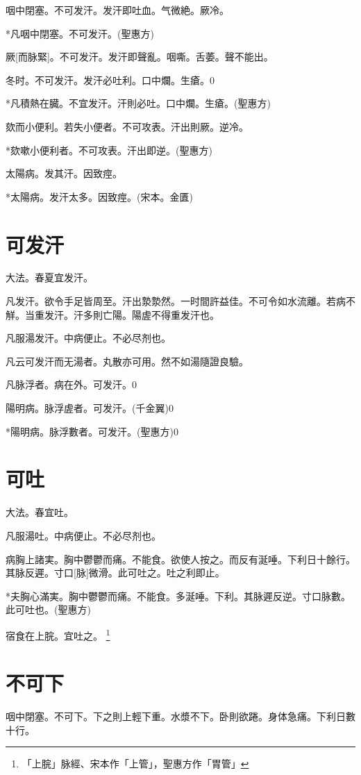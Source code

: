 \documentclass[12pt,twoside,UTF8,b5paper]{ctexbook}
\begin{document}
咽中閉塞。不可发汗。发汗即吐血。气微絶。厥冷。

*凡咽中閉塞。不可发汗。(聖惠方)

厥[而脉緊]。不可发汗。发汗即聲亂。咽嘶。舌萎。聲不能出。

冬时。不可发汗。发汗必吐利。口中爛。生瘡。0

*凡積熱在臓。不宜发汗。汗則必吐。口中爛。生瘡。(聖惠方)

欬而小便利。若失小便者。不可攻表。汗出則厥。逆冷。

*欬嗽小便利者。不可攻表。汗出即逆。(聖惠方)

太陽病。发其汗。因致痙。

*太陽病。发汗太多。因致痙。(宋本。金匱)

\chapter{可发汗}

大法。春夏宜发汗。

凡发汗。欲令手足皆周至。汗出漐漐然。一时間許益佳。不可令如水流離。若病不觧。当重发汗。汗多則亡陽。陽虗不得重发汗也。

凡服湯发汗。中病便止。不必尽剂也。

凡云可发汗而无湯者。丸散亦可用。然不如湯隨證良驗。

凡脉浮者。病在外。可发汗。0

陽明病。脉浮虗者。可发汗。(千金翼)0

*陽明病。脉浮數者。可发汗。(聖惠方)0

\chapter{可吐}

大法。春宜吐。

凡服湯吐。中病便止。不必尽剂也。

病胸上諸実。胸中鬱鬱而痛。不能食。欲使人按之。而反有涎唾。下利日十餘行。其脉反遲。寸口[脉]微滑。此可吐之。吐之利即止。

*夫胸心滿実。胸中鬱鬱而痛。不能食。多涎唾。下利。其脉遲反逆。寸口脉數。此可吐也。(聖惠方)

宿食在上脘。宜吐之。
	\footnote{「上脘」脉經、宋本作「上管」，聖惠方作「胃管」}

\chapter{不可下}

咽中閉塞。不可下。下之則上輕下重。水漿不下。卧則欲踡。身体急痛。下利日數十行。
\end{document}
